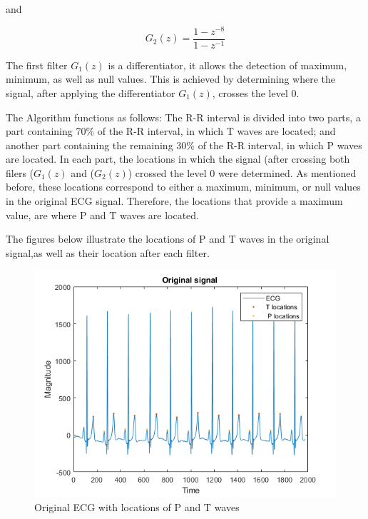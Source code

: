 \documentclass{article}
\begin{document}
 and
 
 \begin{equation}
     G_2(z) = \frac{1-z^{-8}}{1-z^{-1}}
 \end{equation}
 
 The first filter \textit{$G_1(z)$} is a differentiator, it allows the detection of maximum, minimum, as well as null values. This is achieved by determining where the signal, after applying the differentiator \textit{$G_1(z)$}, crosses the level 0.
 
 The Algorithm functions as follows: The R-R interval is divided into two parts, a part containing 70\% of the R-R interval, in which T waves are located; and another part containing the remaining 30\% of the R-R interval, in which P waves are located. In each part, the locations in which the signal (after crossing both filers (\textit{$G_1(z)$} and (\textit{$G_2(z)$}) crossed the level 0 were determined. As mentioned before, these locations correspond to either a maximum, minimum, or null values in the original ECG signal. Therefore, the locations that provide a maximum value, are where P and T waves are located.
 
 The figures below illustrate the locations of P and T waves in the original signal,as well as their location after each filter.
 


\begin{figure}[H]
\centerline{\includegraphics[scale=0.5]{ori_sig.png}}
\caption{Original ECG with locations of P and T waves}
\end{figure}
\end{document}
